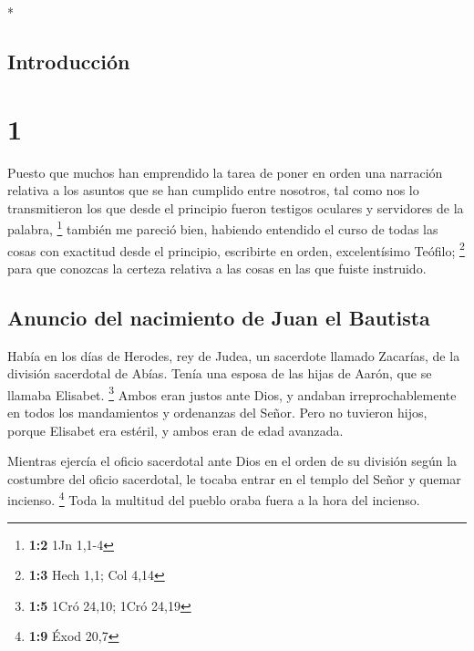 \begin{paracol}{2} \switchcolumn[0]*

\hypertarget{introducciuxf3n}{%
\subsection{Introducción}\label{introducciuxf3n}}

\hypertarget{section}{%
\section{1}\label{section}}

 Puesto que muchos han emprendido la tarea de poner en
orden una narración relativa a los asuntos que se han cumplido entre
nosotros,  tal como nos lo transmitieron los que desde el
principio fueron testigos oculares y servidores de la palabra,
\footnote{\textbf{1:2} 1Jn 1,1-4}  también me pareció
bien, habiendo entendido el curso de todas las cosas con exactitud desde
el principio, escribirte en orden, excelentísimo Teófilo; \footnote{\textbf{1:3}
  Hech 1,1; Col 4,14}  para que conozcas la certeza
relativa a las cosas en las que fuiste instruido.

\hypertarget{anuncio-del-nacimiento-de-juan-el-bautista}{%
\subsection{Anuncio del nacimiento de Juan el
Bautista}\label{anuncio-del-nacimiento-de-juan-el-bautista}}

 Había en los días de Herodes, rey de Judea, un sacerdote
llamado Zacarías, de la división sacerdotal de Abías. Tenía una esposa
de las hijas de Aarón, que se llamaba Elisabet. \footnote{\textbf{1:5}
  1Cró 24,10; 1Cró 24,19}  Ambos eran justos ante Dios, y
andaban irreprochablemente en todos los mandamientos y ordenanzas del
Señor.  Pero no tuvieron hijos, porque Elisabet era
estéril, y ambos eran de edad avanzada.

 Mientras ejercía el oficio sacerdotal ante Dios en el
orden de su división  según la costumbre del oficio
sacerdotal, le tocaba entrar en el templo del Señor y quemar incienso.
\footnote{\textbf{1:9} Éxod 20,7}  Toda la multitud del
pueblo oraba fuera a la hora del incienso.


\end{paracol}
